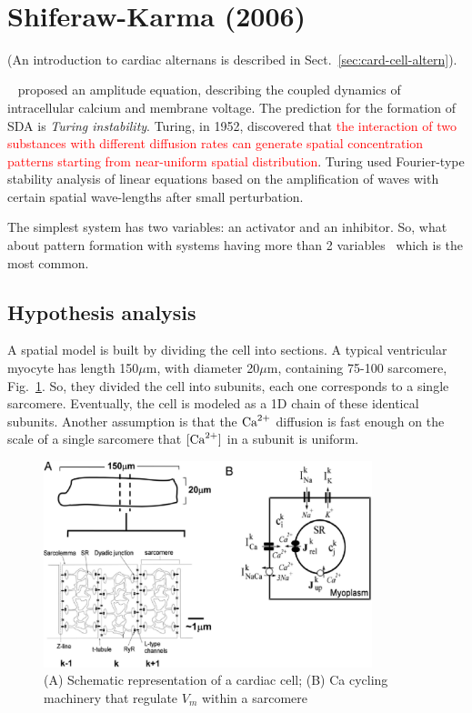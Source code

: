 ~\citep{okada2005}


\section{Shiferaw-Karma (2006)}
\label{sec:shiferaw-karma-2006}

(An introduction to cardiac alternans is described in
Sect.~\ref{sec:card-cell-altern}).  

~\citep{Shiferaw2006} proposed an amplitude equation, describing the
coupled dynamics of intracellular calcium and membrane voltage. The
prediction for the formation of SDA is {\it Turing instability}.
Turing, in 1952, discovered that
\textcolor{red}{the interaction of two substances with different
  diffusion rates can generate spatial concentration patterns starting
  from near-uniform spatial distribution}.
Turing used Fourier-type stability analysis of linear equations based
on the amplification of waves with certain spatial wave-lengths after
small perturbation.

The simplest system has two variables: an activator and an inhibitor.
So, what about pattern formation with systems having more than 2
variables~\citep{Meinhardt2000} which is the most common.

\subsection{Hypothesis analysis}
\label{sec:hypothesis-analysis-13}

A spatial model is built by dividing the cell into sections.
A typical ventricular myocyte has length 150$\mu$m, with diameter
20$\mu$m, containing 75-100 sarcomere,
Fig.~\ref{fig:Shiferaw_Karma}. So, they divided the cell into
subunits, each one corresponds to a single sarcomere. Eventually, the
cell is modeled as a 1D chain of these identical subunits. Another
assumption is that the ${\text{Ca}^{2+}}$ diffusion is fast enough on the scale of
a single sarcomere that $[{\text{Ca}^{2+}}]$ in a subunit is uniform. 

\begin{figure}[hbt]
  \centerline{\includegraphics[height=6cm,
    angle=0]{./images/Shiferaw_Karma.eps}}
 \caption{(A) Schematic representation of a cardiac cell; (B) Ca
   cycling machinery that regulate $V_m$ within a sarcomere}
\label{fig:Shiferaw_Karma}
\end{figure}

